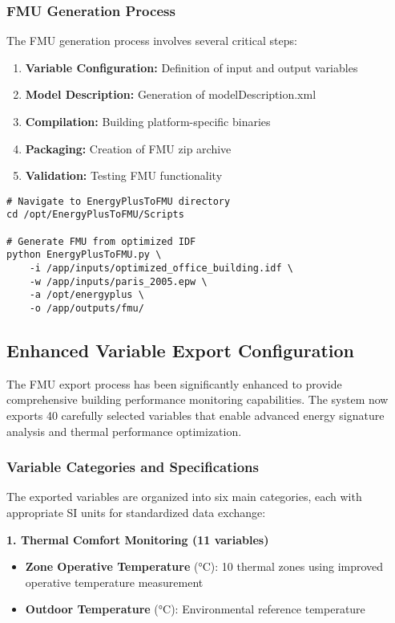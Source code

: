 \documentclass[12pt,a4paper]{article}
\begin{document}
\subsubsection{FMU Generation Process}

The FMU generation process involves several critical steps:

\begin{enumerate}
    \item \textbf{Variable Configuration:} Definition of input and output variables
    \item \textbf{Model Description:} Generation of modelDescription.xml
    \item \textbf{Compilation:} Building platform-specific binaries
    \item \textbf{Packaging:} Creation of FMU zip archive
    \item \textbf{Validation:} Testing FMU functionality
\end{enumerate}

\begin{lstlisting}[style=bash, caption=FMU Generation Command]
# Navigate to EnergyPlusToFMU directory
cd /opt/EnergyPlusToFMU/Scripts

# Generate FMU from optimized IDF
python EnergyPlusToFMU.py \
    -i /app/inputs/optimized_office_building.idf \
    -w /app/inputs/paris_2005.epw \
    -a /opt/energyplus \
    -o /app/outputs/fmu/
\end{lstlisting}

\subsection{Enhanced Variable Export Configuration}

The FMU export process has been significantly enhanced to provide comprehensive building performance monitoring capabilities. The system now exports 40 carefully selected variables that enable advanced energy signature analysis and thermal performance optimization.

\subsubsection{Variable Categories and Specifications}

The exported variables are organized into six main categories, each with appropriate SI units for standardized data exchange:

\textbf{1. Thermal Comfort Monitoring (11 variables)}
\begin{itemize}
    \item \textbf{Zone Operative Temperature} (°C): 10 thermal zones using improved operative temperature measurement
    \item \textbf{Outdoor Temperature} (°C): Environmental reference temperature
\end{itemize}
\end{document}
